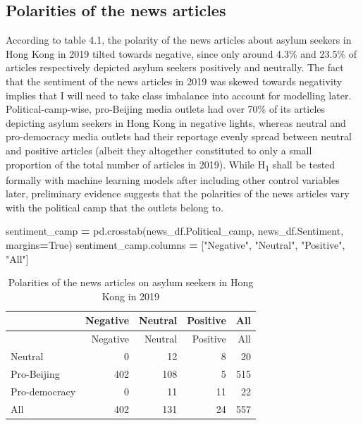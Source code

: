 \documentclass[a4paper, oneside]{report}
\newenvironment{Shaded}{\begin{snugshade}}{\end{snugshade}}
\newcommand{\AttributeTok}[1]{\textcolor[rgb]{0.77,0.63,0.00}{#1}}
\newcommand{\DecValTok}[1]{\textcolor[rgb]{0.00,0.00,0.81}{#1}}
\newcommand{\FunctionTok}[1]{\textcolor[rgb]{0.00,0.00,0.00}{#1}}
\newcommand{\NormalTok}[1]{#1}
\newcommand{\OperatorTok}[1]{\textcolor[rgb]{0.81,0.36,0.00}{\textbf{#1}}}
\newcommand{\SpecialCharTok}[1]{\textcolor[rgb]{0.00,0.00,0.00}{#1}}
\newcommand{\StringTok}[1]{\textcolor[rgb]{0.31,0.60,0.02}{#1}}
\newcommand{\VariableTok}[1]{\textcolor[rgb]{0.00,0.00,0.00}{#1}}
\renewenvironment{Shaded}
{
  \vspace{4pt}%
  \begin{snugshade}%
}{%
  \end{snugshade}%
  \vspace{4pt}%
}
\begin{document}
\hypertarget{polarities-of-the-news-articles}{%
\subsection{Polarities of the news
articles}\label{polarities-of-the-news-articles}}

According to table 4.1, the polarity of the news articles about asylum
seekers in Hong Kong in 2019 tilted towards negative, since only around
4.3\% and 23.5\% of articles respectively depicted asylum seekers
positively and neutrally. The fact that the sentiment of the news
articles in 2019 was skewed towards negativity implies that I will need
to take class imbalance into account for modelling later.
Political-camp-wise, pro-Beijing media outlets had over 70\% of its
articles depicting asylum seekers in Hong Kong in negative lights,
whereas neutral and pro-democracy media outlets had their reportage
evenly spread between neutral and positive articles (albeit they
altogether constituted to only a small proportion of the total number of
articles in 2019). While H\textsubscript{1} shall be tested formally
with machine learning models after including other control variables
later, preliminary evidence suggests that the polarities of the news
articles vary with the political camp that the outlets belong to.

\begin{Shaded}
\begin{Highlighting}[]
\NormalTok{sentiment\_camp }\OperatorTok{=}\NormalTok{ pd.crosstab(news\_df.Political\_camp, news\_df.Sentiment, margins}\OperatorTok{=}\VariableTok{True}\NormalTok{)}
\NormalTok{sentiment\_camp.columns }\OperatorTok{=}\NormalTok{ [}\StringTok{"Negative"}\NormalTok{, }\StringTok{"Neutral"}\NormalTok{, }\StringTok{"Positive"}\NormalTok{, }\StringTok{"All"}\NormalTok{]}
\end{Highlighting}
\end{Shaded}

\begin{Shaded}
\end{Shaded}

\begin{longtable}[]{@{}lrrrr@{}}
\caption{Polarities of the news articles on asylum seekers in Hong Kong
in 2019}\tabularnewline
\toprule
& Negative & Neutral & Positive & All \\
\midrule
\endfirsthead
\toprule
& Negative & Neutral & Positive & All \\
\midrule
\endhead
Neutral & 0 & 12 & 8 & 20 \\
Pro-Beijing & 402 & 108 & 5 & 515 \\
Pro-democracy & 0 & 11 & 11 & 22 \\
All & 402 & 131 & 24 & 557 \\
\bottomrule
\end{longtable}
\end{document}
